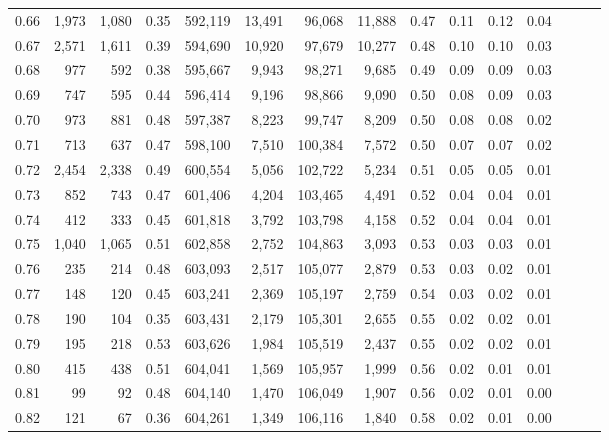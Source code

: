 \begin{tabular}{rrrrrrrrrrrrrrr}
0.66 &   1,973 &  1,080 &  0.35 &  592,119 &   13,491 &   96,068 &   11,888 &  0.47 &  0.11 &  0.12 &      0.04 \\
0.67 &   2,571 &  1,611 &  0.39 &  594,690 &   10,920 &   97,679 &   10,277 &  0.48 &  0.10 &  0.10 &      0.03 \\
0.68 &     977 &    592 &  0.38 &  595,667 &    9,943 &   98,271 &    9,685 &  0.49 &  0.09 &  0.09 &      0.03 \\
0.69 &     747 &    595 &  0.44 &  596,414 &    9,196 &   98,866 &    9,090 &  0.50 &  0.08 &  0.09 &      0.03 \\
0.70 &     973 &    881 &  0.48 &  597,387 &    8,223 &   99,747 &    8,209 &  0.50 &  0.08 &  0.08 &      0.02 \\
0.71 &     713 &    637 &  0.47 &  598,100 &    7,510 &  100,384 &    7,572 &  0.50 &  0.07 &  0.07 &      0.02 \\
0.72 &   2,454 &  2,338 &  0.49 &  600,554 &    5,056 &  102,722 &    5,234 &  0.51 &  0.05 &  0.05 &      0.01 \\
0.73 &     852 &    743 &  0.47 &  601,406 &    4,204 &  103,465 &    4,491 &  0.52 &  0.04 &  0.04 &      0.01 \\
0.74 &     412 &    333 &  0.45 &  601,818 &    3,792 &  103,798 &    4,158 &  0.52 &  0.04 &  0.04 &      0.01 \\
0.75 &   1,040 &  1,065 &  0.51 &  602,858 &    2,752 &  104,863 &    3,093 &  0.53 &  0.03 &  0.03 &      0.01 \\
0.76 &     235 &    214 &  0.48 &  603,093 &    2,517 &  105,077 &    2,879 &  0.53 &  0.03 &  0.02 &      0.01 \\
0.77 &     148 &    120 &  0.45 &  603,241 &    2,369 &  105,197 &    2,759 &  0.54 &  0.03 &  0.02 &      0.01 \\
0.78 &     190 &    104 &  0.35 &  603,431 &    2,179 &  105,301 &    2,655 &  0.55 &  0.02 &  0.02 &      0.01 \\
0.79 &     195 &    218 &  0.53 &  603,626 &    1,984 &  105,519 &    2,437 &  0.55 &  0.02 &  0.02 &      0.01 \\
0.80 &     415 &    438 &  0.51 &  604,041 &    1,569 &  105,957 &    1,999 &  0.56 &  0.02 &  0.01 &      0.01 \\
0.81 &      99 &     92 &  0.48 &  604,140 &    1,470 &  106,049 &    1,907 &  0.56 &  0.02 &  0.01 &      0.00 \\
0.82 &     121 &     67 &  0.36 &  604,261 &    1,349 &  106,116 &    1,840 &  0.58 &  0.02 &  0.01 &      0.00 \\

\end{tabular}
